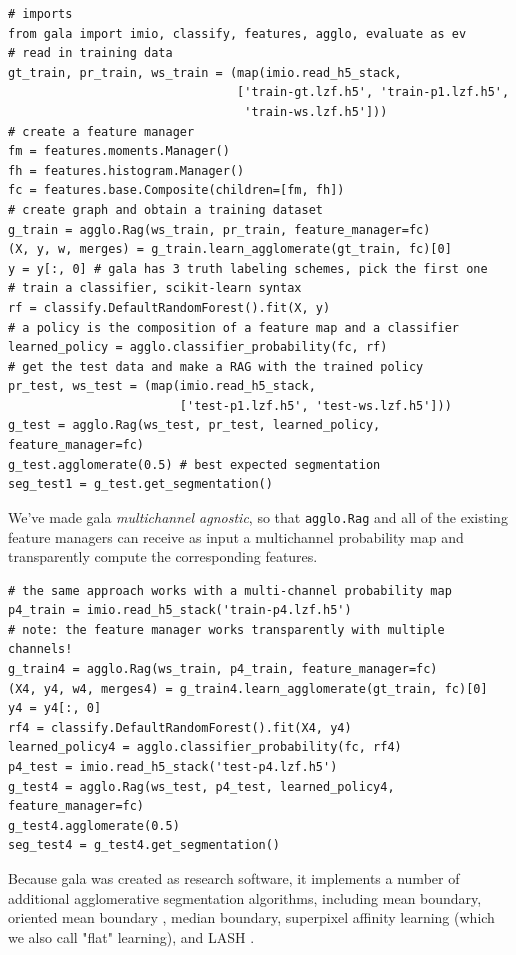 \documentclass{frontiersSCNS} %
\begin{document}
{\small
\begin{verbatim}
# imports
from gala import imio, classify, features, agglo, evaluate as ev
# read in training data
gt_train, pr_train, ws_train = (map(imio.read_h5_stack,
                                ['train-gt.lzf.h5', 'train-p1.lzf.h5',
                                 'train-ws.lzf.h5']))
# create a feature manager
fm = features.moments.Manager()
fh = features.histogram.Manager()
fc = features.base.Composite(children=[fm, fh])
# create graph and obtain a training dataset
g_train = agglo.Rag(ws_train, pr_train, feature_manager=fc)
(X, y, w, merges) = g_train.learn_agglomerate(gt_train, fc)[0]
y = y[:, 0] # gala has 3 truth labeling schemes, pick the first one
# train a classifier, scikit-learn syntax
rf = classify.DefaultRandomForest().fit(X, y)
# a policy is the composition of a feature map and a classifier
learned_policy = agglo.classifier_probability(fc, rf)
# get the test data and make a RAG with the trained policy
pr_test, ws_test = (map(imio.read_h5_stack,
                        ['test-p1.lzf.h5', 'test-ws.lzf.h5']))
g_test = agglo.Rag(ws_test, pr_test, learned_policy, feature_manager=fc)
g_test.agglomerate(0.5) # best expected segmentation
seg_test1 = g_test.get_segmentation()
\end{verbatim}
}

We've made gala \emph{multichannel agnostic}, so that \texttt{\small agglo.Rag} and all of the existing feature managers can receive as input a multichannel probability map and transparently compute the corresponding features.

{\small
\begin{verbatim}
# the same approach works with a multi-channel probability map
p4_train = imio.read_h5_stack('train-p4.lzf.h5')
# note: the feature manager works transparently with multiple channels!
g_train4 = agglo.Rag(ws_train, p4_train, feature_manager=fc)
(X4, y4, w4, merges4) = g_train4.learn_agglomerate(gt_train, fc)[0]
y4 = y4[:, 0]
rf4 = classify.DefaultRandomForest().fit(X4, y4)
learned_policy4 = agglo.classifier_probability(fc, rf4)
p4_test = imio.read_h5_stack('test-p4.lzf.h5')
g_test4 = agglo.Rag(ws_test, p4_test, learned_policy4, feature_manager=fc)
g_test4.agglomerate(0.5)
seg_test4 = g_test4.get_segmentation()
\end{verbatim}
}

Because gala was created as research software, it implements a number of additional agglomerative segmentation algorithms, including mean boundary, oriented mean boundary \citep{Arbelaez:jg}, median boundary, superpixel affinity learning \citep{Ren:2003jg} (which we also call "flat" learning), and LASH \citep{Jain:2011vr}.
\end{document}
